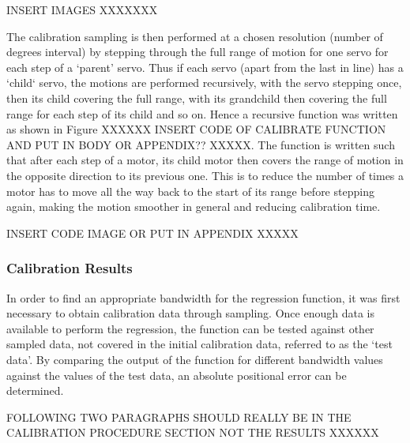 \documentclass[11pt]{article}
\begin{document}
INSERT IMAGES XXXXXXX


The calibration sampling is then performed at a chosen resolution (number of degrees interval) by stepping through the full range of motion for one servo for each step of a `parent' servo. Thus if each servo (apart from the last in line) has a `child` servo, the motions are performed recursively, with the servo stepping once, then its child covering the full range, with its grandchild then covering the full range for each step of its child and so on. Hence a recursive function was written as shown in Figure XXXXXX INSERT CODE OF CALIBRATE FUNCTION AND PUT IN BODY OR APPENDIX?? XXXXX. The function is written such that after each step of a motor, its child motor then covers the range of motion in the opposite direction to its previous one. This is to reduce the number of times a motor has to move all the way back to the start of its range before stepping again, making the motion smoother in general and reducing calibration time. 

INSERT CODE IMAGE OR PUT IN APPENDIX XXXXX	





\subsubsection{Calibration Results}
In order to find an appropriate bandwidth for the regression function, it was first necessary to obtain calibration data through sampling. Once enough data is available to perform the regression, the function can be tested against other sampled data, not covered in the initial calibration data, referred to as the `test data'. By comparing the output of the function for different bandwidth values against the values of the test data, an absolute positional error can be determined. 

FOLLOWING TWO PARAGRAPHS SHOULD REALLY BE IN THE CALIBRATION PROCEDURE SECTION NOT THE RESULTS XXXXXX
\end{document}
